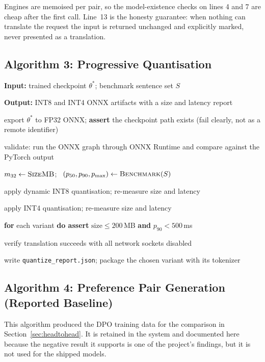 Engines are memoised per pair, so the model-existence checks on lines 4 and 7
are cheap after the first call. Line~13 is the honesty guarantee: when nothing
can translate the request the input is returned unchanged and explicitly marked,
never presented as a translation.

\subsection{Algorithm 3: Progressive Quantisation}
\label{subsec:alg3}

\noindent \textbf{Input:} trained checkpoint $\theta^{*}$; benchmark sentence set $S$\par\nopagebreak
\noindent \textbf{Output:} INT8 and INT4 ONNX artifacts with a size and latency report\par\nopagebreak
\vspace{2pt}
\begin{algsteps}
\item export $\theta^{*}$ to FP32 ONNX; \textbf{assert} the checkpoint path exists (fail clearly, not as a remote identifier)
\item validate: run the ONNX graph through ONNX Runtime and compare against the PyTorch output
\item $m_{32} \leftarrow \textsc{SizeMB}$; \ $(p_{50}, p_{90}, p_{\max}) \leftarrow \textsc{Benchmark}(S)$
\item apply dynamic INT8 quantisation; re-measure size and latency
\item apply INT4 quantisation; re-measure size and latency
\item \textbf{for} each variant \textbf{do assert} $\text{size} \leq 200$\,MB \textbf{and} $p_{90} < 500$\,ms
\item verify translation succeeds with all network sockets disabled
\item write \texttt{quantize\_report.json}; package the chosen variant with its tokenizer
\end{algsteps}

\subsection{Algorithm 4: Preference Pair Generation (Reported Baseline)}
\label{subsec:alg4}

This algorithm produced the DPO training data for the comparison in
Section~\ref{sec:headtohead}. It is retained in the system and documented here
because the negative result it supports is one of the project's findings, but it
is not used for the shipped models.

